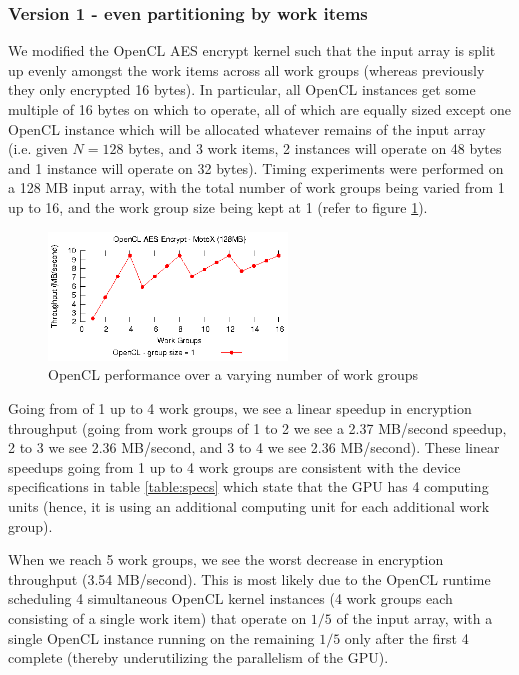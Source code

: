 \documentclass[conference,10pt]{IEEEtran}
\begin{document}
\subsubsection{Version 1 - even partitioning by work items}
\label{subsec:impl_partition}

We modified the OpenCL AES encrypt kernel such that the input array is split up evenly amongst the work 
items across all work groups (whereas previously they only encrypted 16 bytes). In particular, all OpenCL 
instances get some multiple of 16 bytes on which to operate, all of which are equally sized except one 
OpenCL instance which will be allocated whatever remains of the input array (i.e.  given $N = 128$ bytes, 
and 3 work items, 2 instances will operate on 48 bytes and 1 instance will operate on 32 bytes). 
Timing experiments were performed on a 128 MB input array, with the total number of work groups being 
varied from 1 up to 16, and the work group size being kept at 1 (refer to figure 
\ref{fig:num_work_groups}).

\begin{figure}[!t]
\centering
\includegraphics[width=2.5in]{../final/motox/4.2/sample_opencl_aes_global_worksize.128MB.16_max_global_worksize.again.report.eps}
\caption{OpenCL performance over a varying number of work groups}
\label{fig:num_work_groups}
\end{figure}

Going from of 1 up to 4 work groups, we see a linear speedup in encryption throughput (going from work 
groups of 1 to 2 we see a 2.37 MB/second speedup, 2 to 3 we see 2.36 MB/second, and 3 to 4 we see 2.36 
MB/second). These linear speedups going from 1 up to 4 work groups are consistent with the device 
specifications in table \ref{table:specs} which state that the GPU has 4 computing units (hence, it is 
using an additional computing unit for each additional work group).

When we reach 5 work groups, we see the worst decrease in encryption throughput (3.54 MB/second).  This is 
most likely due to the OpenCL runtime scheduling 4 simultaneous OpenCL kernel instances (4 work groups each 
consisting of a single work item) that operate on $1/5$ of the input array, with a single OpenCL instance 
running on the remaining $1/5$ only after the first 4 complete (thereby underutilizing the parallelism of 
the GPU).
\end{document}
